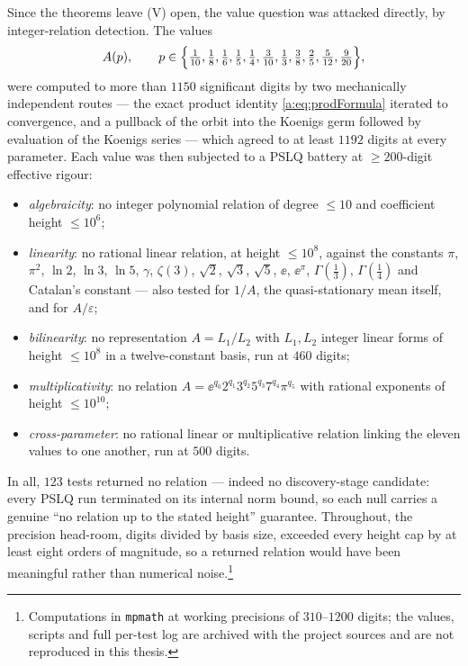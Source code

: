 Since the theorems leave (V) open, the value question was attacked directly, by
integer-relation detection. The values
\begin{equation}
\label{a:eq:pslqparams}
A(p),\qquad
p\in\Bigl\{\tfrac1{10},\tfrac18,\tfrac16,\tfrac15,\tfrac14,\tfrac3{10},
\tfrac13,\tfrac38,\tfrac25,\tfrac5{12},\tfrac9{20}\Bigr\},
\end{equation}
were computed to more than $1150$ significant digits by two mechanically
independent routes --- the exact product identity \cref{a:eq:prodFormula} iterated
to convergence, and a pullback of the orbit into the Koenigs germ followed by
evaluation of the Koenigs series --- which agreed to at least $1192$ digits at every
parameter. Each value was then subjected to a PSLQ battery at $\ge200$-digit
effective rigour:
\begin{itemize}[leftmargin=*]
\item \emph{algebraicity}: no integer polynomial relation of degree $\le10$ and
      coefficient height $\le10^{6}$;
\item \emph{linearity}: no rational linear relation, at height $\le10^{8}$, against
      the constants $\pi$, $\pi^{2}$, $\ln2$, $\ln3$, $\ln5$, $\gamma$, $\zeta(3)$,
      $\sqrt2$, $\sqrt3$, $\sqrt5$, $\ee$, $\ee^{\pi}$, $\Gamma(\tfrac13)$,
      $\Gamma(\tfrac14)$ and Catalan's constant --- also tested for $1/A$, the
      quasi-stationary mean itself, and for $A/\varepsilon$;
\item \emph{bilinearity}: no representation $A = L_1/L_2$ with $L_1,L_2$ integer
      linear forms of height $\le10^{8}$ in a twelve-constant basis, run at $460$
      digits;
\item \emph{multiplicativity}: no relation
      $A = \ee^{q_0}2^{q_1}3^{q_2}5^{q_3}7^{q_4}\pi^{q_5}$ with rational exponents
      of height $\le10^{10}$;
\item \emph{cross-parameter}: no rational linear or multiplicative relation linking
      the eleven values to one another, run at $500$ digits.
\end{itemize}
In all, $123$ tests returned no relation --- indeed no discovery-stage candidate:
every PSLQ run terminated on its internal norm bound, so each null carries a
genuine ``no relation up to the stated height'' guarantee. Throughout, the
precision head-room, digits divided by basis size, exceeded every height cap by at
least eight orders of magnitude, so a returned relation would have been meaningful
rather than numerical noise.\footnote{Computations in \texttt{mpmath} at working
precisions of $310$--$1200$ digits; the values, scripts and full per-test log are
archived with the project sources and are not reproduced in this thesis.}

